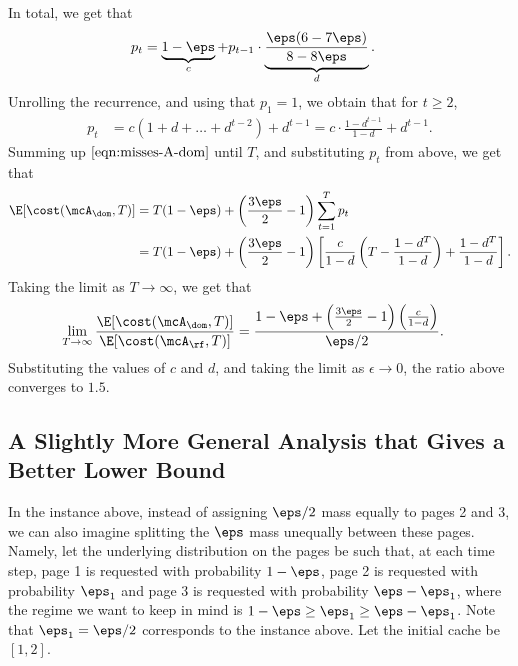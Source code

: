 \documentclass[11pt]{article}
\begin{document}
In total, we get that
\begin{align*}
    p_t &= \underbrace{1-\eps}_{c} + p_{t-1}\cdot \underbrace{\frac{\eps(6-7\eps)}{8-8\eps}}_{d}. 
\end{align*}
Unrolling the recurrence, and using that $p_{1}=1$, we obtain that for $t \ge 2$,
\begin{align*}
    p_t &= c(1+d+\dots+d^{t-2}) + d^{t-1} = c\cdot \frac{1-d^{t-1}}{1-d} + d^{t-1}.
\end{align*}
Summing up $\eqref{eqn:misses-A-dom}$ until $T$, and substituting $p_t$ from above, we get that
\begin{align*}
    \E[\cost(\mcA_\dom, T)] &= T(1-\eps) + \left(\frac{3\eps}{2}-1\right)\sum_{t=1}^{T}p_t \\
    &= T(1-\eps) + \left(\frac{3\eps}{2}-1\right)\left[\frac{c}{1-d}\left(T-\frac{1-d^T}{1-d}\right)+\frac{1-d^T}{1-d}\right].
\end{align*}
Taking the limit as $T \to \infty$, we get that
\begin{align*}
    \lim_{T \to \infty}\frac{\E[\cost(\mcA_\dom, T)]}{\E[\cost(\mcA_\rf, T)]} &= \frac{1-\eps+\left(\frac{3\eps}{2}-1\right)\left(\frac{c}{1-d}\right)}{\eps/2}.
\end{align*}
Substituting the values of $c$ and $d$, and taking the limit as $\epsilon \to 0$, the ratio above converges to $1.5$.

\subsection{A Slightly More General Analysis that Gives a Better Lower Bound}
\label{sec:1.5907-lb}

In the instance above, instead of assigning $\eps/2$ mass equally to pages 2 and 3, we can also imagine splitting the $\eps$ mass unequally between these pages. Namely, let the underlying distribution on the pages be such that, at each time step, page 1 is requested with probability $1-\eps$, page 2 is requested with probability $\eps_1$ and page 3 is requested with probability $\eps-\eps_1$, where the regime we want to keep in mind is $1-\eps \ge \eps_1 \ge \eps-\eps_1$. Note that $\eps_1=\eps/2$ corresponds to the instance above. Let the initial cache be $[1,2]$.
\end{document}
